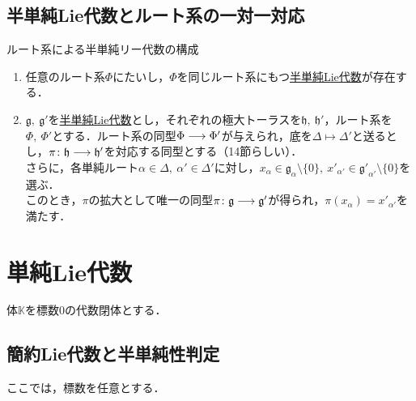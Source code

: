\documentclass[rep_main]{subfiles}
\begin{document}
\subsection{半単純Lie代数とルート系の一対一対応}
\begin{mytheo}[label=thm:root-to-Lie-alg]{ルート系による半単純リー代数の構成}
	\begin{enumerate}
		\item 任意のルート系$\Phi$にたいし，$\Phi$を同じルート系にもつ\hyperref[def:semisimple-LieAlg]{半単純Lie代数}が存在する．
		\item $\mathfrak{g},\ \mathfrak{g}'$を\hyperref[def:semisimple-LieAlg]{半単純Lie代数}とし，それぞれの極大トーラスを$\mathfrak{h},\ \mathfrak{h}'$，ルート系を$\Phi,\ \Phi'$とする．ルート系の同型$\Phi \longrightarrow \Phi'$が与えられ，底を$\Delta \mapsto \Delta'$と送るとし，$\pi\colon \mathfrak{h} \longrightarrow \mathfrak{h}'$を対応する同型とする（14節らしい）．\\
		さらに，各単純ルート$\alpha \in \Delta,\ \alpha' \in \Delta'$に対し，$x_\alpha \in \mathfrak{g}_\alpha \setminus \{0\},\ x'_{\alpha'} \in \mathfrak{g'}_{\alpha'} \setminus \{0\}$を選ぶ．\\
		このとき，$\pi$の拡大として唯一の同型$\pi\colon \mathfrak{g} \longrightarrow \mathfrak{g}'$が得られ，$\pi(x_\alpha) = x'_{\alpha'}$を満たす．
	\end{enumerate}
	
\end{mytheo}


\section{単純Lie代数}
体$\mathbb{K}$を標数$0$の代数閉体とする．
\subsection{簡約Lie代数と半単純性判定}
ここでは，標数を任意とする．
\end{document}
